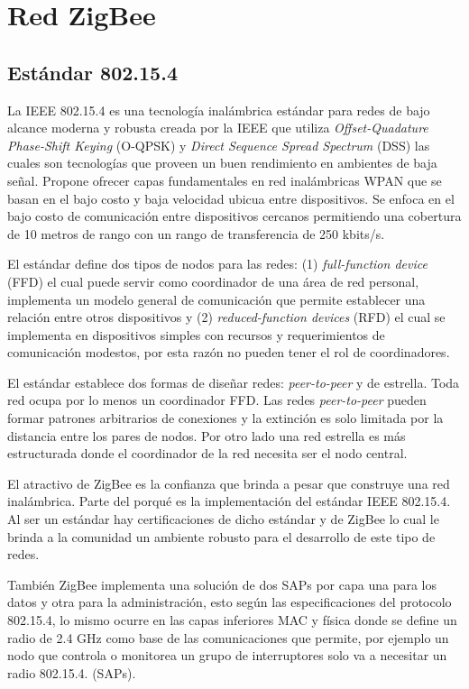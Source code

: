 \documentclass[10pt,journal,compsoc]{IEEEtran}
\begin{document}
\section{Red ZigBee}
\subsection{Estándar 802.15.4}
La IEEE 802.15.4 es una tecnología inalámbrica estándar para redes de bajo alcance moderna y robusta creada por la IEEE que utiliza \emph{Offset-Quadature Phase-Shift Keying} (O-QPSK) y \emph{Direct Sequence Spread Spectrum} (DSS) las cuales son tecnologías que proveen un buen rendimiento en ambientes de baja señal. Propone ofrecer capas fundamentales en red inalámbricas WPAN que se basan en el bajo costo y baja velocidad ubicua entre dispositivos. Se enfoca en el bajo costo de comunicación entre dispositivos cercanos permitiendo una cobertura de 10 metros de rango con un rango de transferencia de 250 kbits/s. 

El estándar define dos tipos de nodos para las redes: (1) \emph{full-function device} (FFD) el cual puede servir como coordinador de una área de red personal, implementa un modelo general de comunicación que permite establecer una relación entre otros dispositivos y (2) \emph{reduced-function devices} (RFD) el cual se implementa en dispositivos simples con recursos y requerimientos de comunicación modestos, por esta razón no pueden tener el rol de coordinadores. 

El estándar establece dos formas de diseñar redes: \emph{peer-to-peer} y de estrella. Toda red ocupa por lo menos un coordinador FFD. Las redes \emph{peer-to-peer} pueden formar patrones arbitrarios de conexiones y la extinción es solo limitada por la distancia entre los pares de nodos. Por otro lado una red estrella es más estructurada donde el coordinador de la red necesita ser el nodo central.

El atractivo de ZigBee es la confianza que brinda a pesar que construye una red inalámbrica. Parte del porqué es la implementación del estándar IEEE 802.15.4. Al ser un estándar hay certificaciones de dicho estándar y de ZigBee lo cual le brinda a la comunidad un ambiente robusto para el desarrollo de este tipo de redes.

También ZigBee implementa una solución de dos SAPs por capa una para los datos y otra para la administración, esto según las especificaciones del protocolo 802.15.4, lo mismo ocurre en las capas inferiores MAC y física donde se define un radio de 2.4 GHz como base de las comunicaciones que permite, por ejemplo un nodo que controla o monitorea un grupo de interruptores solo va a necesitar un radio 802.15.4. (SAPs).
\end{document}

